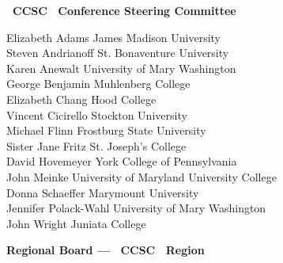 \documentclass{article}
\begin{document}
\begingroup
  \centering
  \textbf{\large \confYear\ CCSC \confName\ Conference Steering Committee}\\
\endgroup

\vspace{10pt}

{\parindent0pt
Elizabeth Adams \dotfill James Madison University\\
Steven Andrianoff \dotfill St. Bonaventure University\\
Karen Anewalt \dotfill University of Mary Washington\\
George Benjamin \dotfill Muhlenberg College\\
Elizabeth Chang \dotfill Hood College\\
Vincent Cicirello \dotfill Stockton University\\
Michael Flinn \dotfill Frostburg State University\\
Sister Jane Fritz \dotfill St. Joseph's College\\
David Hovemeyer \dotfill York College of Pennsylvania\\
John Meinke \dotfill University of Maryland University College\\
Donna Schaeffer \dotfill Marymount University\\
Jennifer Polack-Wahl \dotfill University of Mary Washington\\
John Wright \dotfill Juniata College\\
}

\vspace{10pt}
\vspace{10pt}

\begingroup
  \centering
  \textbf{\large Regional Board --- \confYear\ CCSC \confName\ Region}\\
\endgroup

\vspace{10pt}
\end{document}
